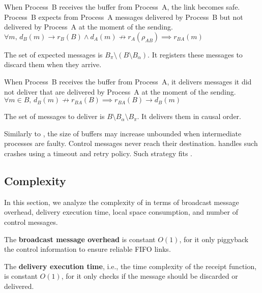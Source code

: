 \begin{enumerate}[leftmargin=*]
\begin{definition}[To expect]
  When Process~B receives the buffer from Process~A, the link becomes safe.
  Process~B expects from Process~A messages delivered by Process~B but not
  delivered by Process~A at the moment of the sending.
  $\forall m,\, d_B(m) \rightarrow r_B(B)  \wedge d_A(m) \not\rightarrow r_A(\rho_{AB}) \implies r_{BA}(m)$
\end{definition}

The set of expected messages is $B_\pi \setminus (B \setminus B_\alpha)$.  It
registers these messages to discard them when they arrive.

\begin{definition}[To deliver]
  When Process~B receives the buffer from Process~A, it delivers messages it did
  not deliver that are delivered by Process~A at the moment of the sending.
  $\forall m \in B,\, d_B(m) \not\rightarrow r_{BA}(B) \implies r_{BA}(B) \rightarrow
  d_B(m)$
\end{definition}

The set of messages to deliver is $B\setminus B_\alpha \setminus B_\pi$. It
delivers them in causal order.
\end{enumerate}



Similarly to \PCBROADCAST, the size of buffers may increase unbounded when
intermediate processes are faulty. Control messages never reach their
destination. \PCBROADCAST handles such crashes using a timeout and retry
policy. Such strategy fits \RPCBROADCAST.


\subsection{Complexity}
\label{subsec:complexity}

In this section, we analyze the complexity of \RPCBROADCAST in terms of
broadcast message overhead, delivery execution time, local space consumption,
and number of control messages. 

\noindent The \textbf{broadcast message overhead} is constant $O(1)$, for it
only piggyback the control information to ensure reliable FIFO links.

\noindent The \textbf{delivery execution time}, i.e., the time complexity of the
receipt function, is constant $O(1)$, for it only checks if the message should
be discarded or delivered.

